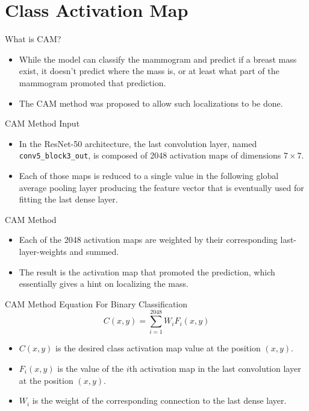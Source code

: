 \documentclass{beamer}
\begin{document}
\section{Class Activation Map}

\begin{frame}{What is CAM?}
  \begin{itemize}
    \item While the model can classify the mammogram and predict if a breast
      mass exist, it doesn't predict where the mass is, or at least what part
      of the mammogram \alert{promoted that prediction}.
    \item The CAM method was proposed to allow such localizations to be done.
  \end{itemize}
\end{frame}

\begin{frame}{CAM Method Input}
  \begin{itemize}
    \item In the ResNet-50 architecture, the last convolution layer, named
      \texttt{conv5\_block3\_out}, is composed of 2048 activation maps of
      dimensions $7 \times 7$.
    \item Each of those maps is reduced to a single value in the following
      \alert{global average pooling} layer producing the feature vector that
      is eventually used for fitting the last dense layer.
  \end{itemize}
\end{frame}

\begin{frame}{CAM Method}
  \begin{itemize}
    \item Each of the 2048 activation maps are weighted by their corresponding
      last-layer-weights and summed.
    \item The result is the activation map that promoted the prediction, which
      essentially gives a \alert{hint on localizing the mass}.
  \end{itemize}
\end{frame}

\begin{frame}{CAM Method Equation For Binary Classification}
  \begin{equation}
    C(x, y) = \sum_{i = 1}^{2048}{W_i F_i(x, y)}
  \end{equation}

  \begin{itemize}
    \item $C(x, y)$ is the desired class activation map value at the position
      $(x, y)$.
    \item $F_i(x, y)$ is the value of the $i$th activation map in the last
      convolution layer at the position $(x, y)$.
    \item $W_i$ is the weight of the corresponding connection to the last dense
      layer.
  \end{itemize}
\end{frame}
\end{document}
